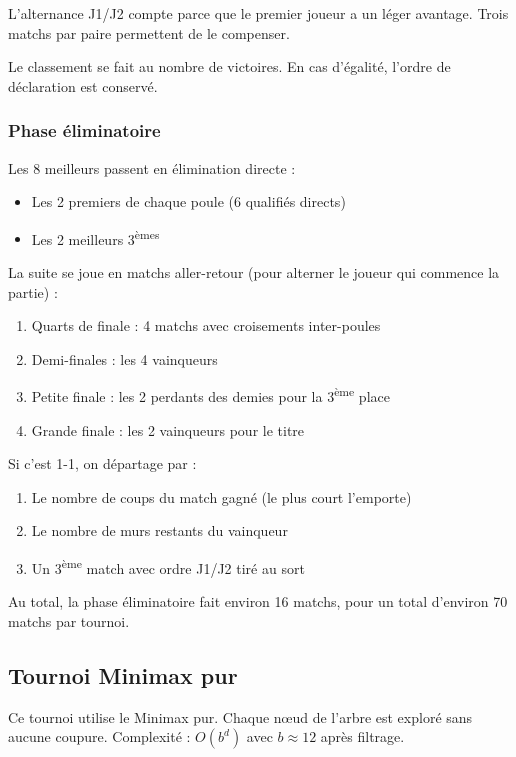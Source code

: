 \documentclass[a4paper, 12pt]{report}
\begin{document}
L'alternance J1/J2 compte parce que le premier joueur a un léger avantage. Trois matchs par paire permettent de le compenser.

Le classement se fait au nombre de victoires. En cas d'égalité, l'ordre de déclaration est conservé.

\subsubsection{Phase éliminatoire}

Les 8 meilleurs passent en élimination directe :
\begin{itemize}
    \item Les 2 premiers de chaque poule (6 qualifiés directs)
    \item Les 2 meilleurs 3\textsuperscript{èmes}
\end{itemize}

La suite se joue en matchs aller-retour (pour alterner le joueur qui commence la partie) :
\begin{enumerate}
    \item Quarts de finale : 4 matchs avec croisements inter-poules
    \item Demi-finales : les 4 vainqueurs
    \item Petite finale : les 2 perdants des demies pour la 3\textsuperscript{ème} place
    \item Grande finale : les 2 vainqueurs pour le titre
\end{enumerate}

Si c'est 1-1, on départage par :
\begin{enumerate}
    \item Le nombre de coups du match gagné (le plus court l'emporte)
    \item Le nombre de murs restants du vainqueur
    \item Un 3\textsuperscript{ème} match avec ordre J1/J2 tiré au sort
\end{enumerate}

Au total, la phase éliminatoire fait environ 16 matchs, pour un total d'environ 70 matchs par tournoi.

\subsection{Tournoi Minimax pur }

Ce tournoi utilise le Minimax pur. Chaque n\oe{}ud de l'arbre est exploré sans aucune coupure. Complexité : $O(b^d)$ avec $b \approx 12$ après filtrage.
\end{document}
